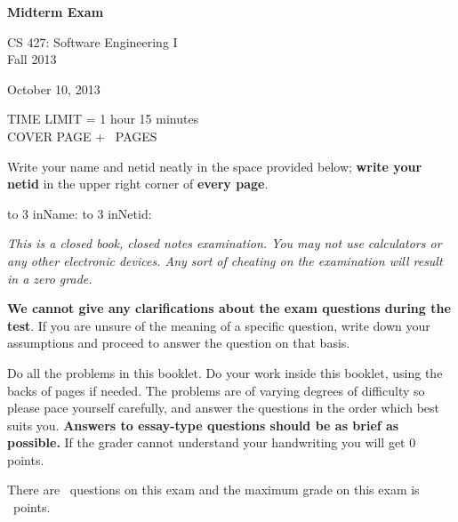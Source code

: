 \documentclass[11pt]{exam}
\begin{document}
\lstset{language=Java,numbers=left,tabsize=4} \begin{coverpages}
 \begin{center}
{\Large\textbf{Midterm Exam}}

 \vspace{0.1 in}

CS 427: Software Engineering I\\ Fall 2013

 \vspace{0.1 in}

October 10, 2013

 \vspace{0.1 in}

TIME LIMIT = 1 hour 15 minutes \\ COVER PAGE + \numpages\ PAGES \end{center}

 \noindent Write your name and netid neatly in the space provided below; \textbf{write
your netid} in the upper right corner of \textbf{every page}.

 \vspace{0.1 in}

 \hbox to 3 in{Name:\enspace\hrulefill} \hbox to 3 in{Netid:\enspace\hrulefill}

 \vspace{0.1 in}

 \noindent \emph{This is a closed book, closed notes examination. You may not
use calculators or any other electronic devices. Any sort of cheating on the
examination will result in a zero grade.}

 \vspace{0.1 in}

 \noindent \textbf{We cannot give any clarifications about the exam questions
during the test}. If you are unsure of the meaning of a specific question, write
down your assumptions and proceed to answer the question on that basis.

 \vspace{0.1 in}

 \noindent Do all the problems in this booklet. Do your work inside this
booklet, using the backs of pages if needed. The problems are of varying degrees
of difficulty so please pace yourself carefully, and answer the questions in the
order which best suits you. \textbf{Answers to essay-type questions should be as brief
as possible.} If the grader cannot understand your handwriting you will get 0
points.

 \vspace{0.1 in}

 \noindent There are \numquestions\ questions on this exam and the maximum grade
on this exam is \numpoints\ points.

 \vspace{0.2 in}

 \gradetable[v][pages] \end{coverpages}
\end{document}
